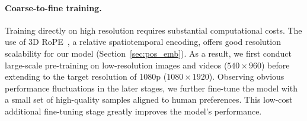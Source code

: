 \paragraph{Coarse-to-fine training.}

Training directly on high resolution requires substantial computational costs. The use of 3D RoPE~\citep{rope, cogvideox}, a relative spatiotemporal encoding, offers good resolution scalability for our model (Section~\ref{sec:pos_emb}). As a result, we first conduct large-scale pre-training on low-resolution images and videos ($540 \times 960$) before extending to the target resolution of 1080p ($1080 \times 1920$). Observing obvious performance fluctuations in the later stages, we further fine-tune the model with a small set of high-quality samples aligned to human preferences. This low-cost additional fine-tuning stage greatly improves the model's performance.


